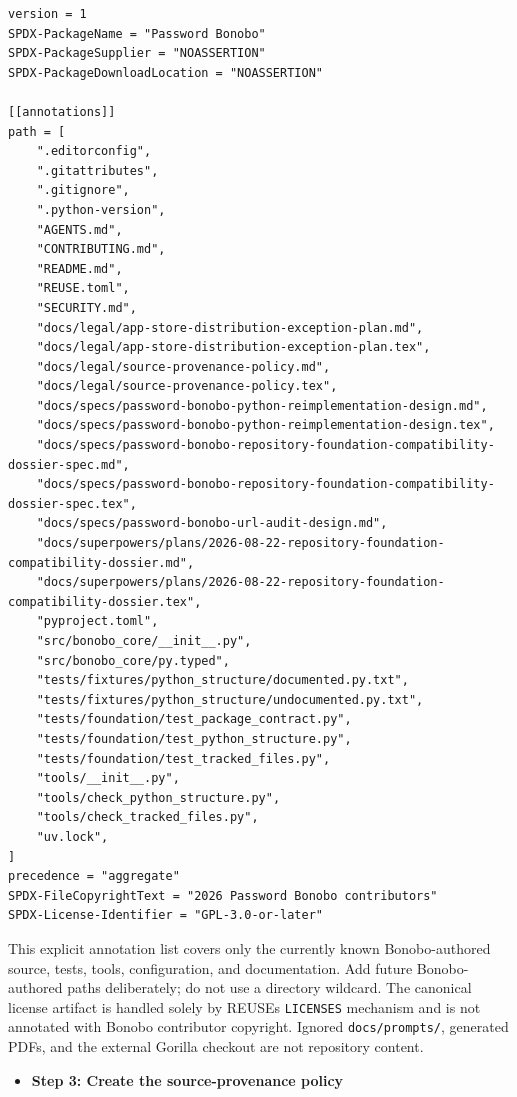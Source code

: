 \documentclass[
  letterpaper,
]{article}
\newcommand{\passthrough}[1]{#1}
\providecommand{\tightlist}{%
  \setlength{\itemsep}{0pt}\setlength{\parskip}{0pt}}
\begin{document}
\begin{lstlisting}
version = 1
SPDX-PackageName = "Password Bonobo"
SPDX-PackageSupplier = "NOASSERTION"
SPDX-PackageDownloadLocation = "NOASSERTION"

[[annotations]]
path = [
    ".editorconfig",
    ".gitattributes",
    ".gitignore",
    ".python-version",
    "AGENTS.md",
    "CONTRIBUTING.md",
    "README.md",
    "REUSE.toml",
    "SECURITY.md",
    "docs/legal/app-store-distribution-exception-plan.md",
    "docs/legal/app-store-distribution-exception-plan.tex",
    "docs/legal/source-provenance-policy.md",
    "docs/legal/source-provenance-policy.tex",
    "docs/specs/password-bonobo-python-reimplementation-design.md",
    "docs/specs/password-bonobo-python-reimplementation-design.tex",
    "docs/specs/password-bonobo-repository-foundation-compatibility-dossier-spec.md",
    "docs/specs/password-bonobo-repository-foundation-compatibility-dossier-spec.tex",
    "docs/specs/password-bonobo-url-audit-design.md",
    "docs/superpowers/plans/2026-08-22-repository-foundation-compatibility-dossier.md",
    "docs/superpowers/plans/2026-08-22-repository-foundation-compatibility-dossier.tex",
    "pyproject.toml",
    "src/bonobo_core/__init__.py",
    "src/bonobo_core/py.typed",
    "tests/fixtures/python_structure/documented.py.txt",
    "tests/fixtures/python_structure/undocumented.py.txt",
    "tests/foundation/test_package_contract.py",
    "tests/foundation/test_python_structure.py",
    "tests/foundation/test_tracked_files.py",
    "tools/__init__.py",
    "tools/check_python_structure.py",
    "tools/check_tracked_files.py",
    "uv.lock",
]
precedence = "aggregate"
SPDX-FileCopyrightText = "2026 Password Bonobo contributors"
SPDX-License-Identifier = "GPL-3.0-or-later"
\end{lstlisting}

This explicit annotation list covers only the currently known Bonobo-authored source, tests, tools, configuration, and
documentation. Add future Bonobo-authored paths deliberately; do not use a directory wildcard. The canonical license
artifact is handled solely by REUSE\textquotesingle s \passthrough{\lstinline!LICENSES!} mechanism and is not annotated
with Bonobo contributor copyright. Ignored \nolinkurl{docs/prompts/}, generated PDFs, and the external Gorilla checkout
are not repository content.

\begin{itemize}
\tightlist
\item[$\boxtimes$]
  \textbf{Step 3: Create the source-provenance policy}
\end{itemize}
\end{document}
